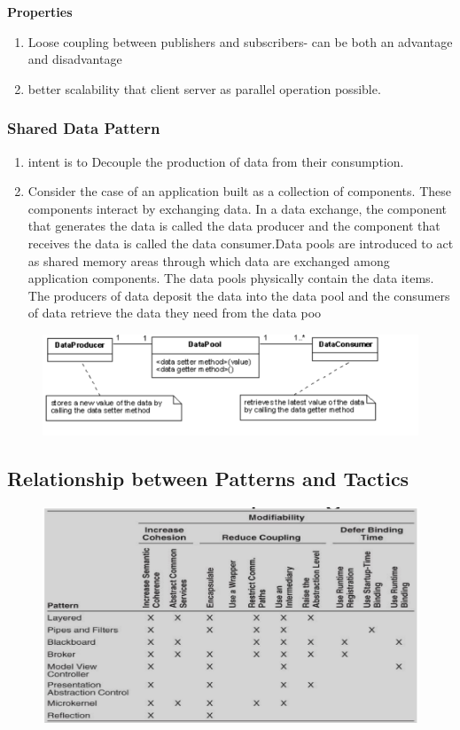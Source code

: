 \documentclass[a4paper]{article}
\begin{document}
\textbf{Properties}
\begin{enumerate}
\item Loose coupling between publishers and subscribers- can be both an advantage and disadvantage
\item better scalability that client server as parallel operation possible.
\end{enumerate}

\subsubsection{Shared Data Pattern}
\begin{enumerate}
\item intent is to Decouple the production of data from their consumption.
\item Consider the case of an application built as a collection of components. These components interact by exchanging data. In a data exchange, the component that generates the data is called the data producer and the component that receives the data is called the data consumer.Data pools are introduced to act as shared memory areas through which data are exchanged among application components. The data pools physically contain the data items. The producers of data deposit the data into the data pool and the consumers of data retrieve the data they need from the data poo

\end{enumerate}


\begin{figure}[h]
\centering 
\includegraphics[scale=0.8]{images/shareddata.png}
\end{figure}

\subsection{Relationship between Patterns and Tactics}

\begin{figure}[H]
  \includegraphics[scale=0.5]{images/relationship.png}
\end{figure}
\end{document}
